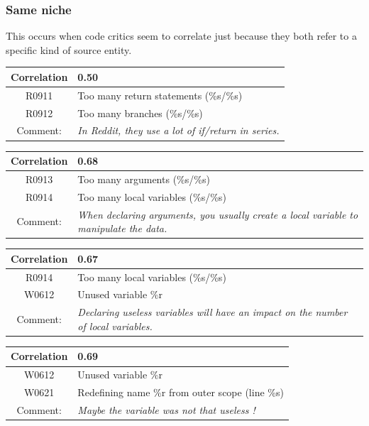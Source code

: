 \documentclass[12pt, a4paper]{article}
\newcommand{\tbf}[1]{\textbf{#1}}
\newcommand{\noi}{\noindent}
\begin{document}

\subsubsection*{Same niche}
This occurs when code critics seem to correlate just because they both refer to a specific kind of source entity.

\bigskip \noi
\begin{tabularx}{\textwidth}{|c|X|}
\hline
\tbf{Correlation}   & 0.50 \\
\hline
R0911   & Too many return statements (\%s/\%s) \\
\hline
R0912   & Too many branches (\%s/\%s) \\
\hline
Comment: & \textit{In Reddit, they use a lot of if/return in series.}\\
\hline
\end{tabularx}


\bigskip \noi
\begin{tabularx}{\textwidth}{|c|X|}
\hline
\tbf{Correlation}   & 0.68 \\
\hline
R0913   & Too many arguments (\%s/\%s) \\
\hline
R0914   & Too many local variables (\%s/\%s) \\
\hline
Comment: & \textit{When declaring arguments, you usually create a local variable to manipulate the data.}\\
\hline
\end{tabularx}

\bigskip \noi
\begin{tabularx}{\textwidth}{|c|X|}
\hline
\tbf{Correlation}   & 0.67 \\
\hline
R0914   & Too many local variables (\%s/\%s) \\
\hline
W0612   & Unused variable \%r \\
\hline
Comment: & \textit{Declaring useless variables will have an impact on the number of local variables.}\\
\hline
\end{tabularx}

\bigskip \noi
\begin{tabularx}{\textwidth}{|c|X|}
\hline
\tbf{Correlation}   & 0.69 \\
\hline
W0612   & Unused variable \%r \\
\hline
W0621   & Redefining name \%r from outer scope (line \%s) \\
\hline
Comment: & \textit{Maybe the variable was not that useless !}\\
\hline
\end{tabularx}
\end{document}
